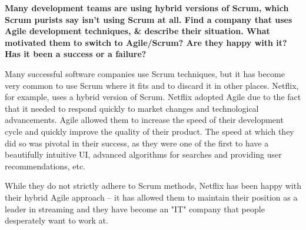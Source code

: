 \documentclass{article}
\begin{document}
\textbf{Many development teams are using hybrid versions of Scrum, which Scrum purists say isn't using Scrum at all. Find a company that uses Agile development techniques, \& describe their situation. What motivated them to switch to Agile/Scrum? Are they happy with it? Has it been a success or a failure?}

Many successful software companies use Scrum techniques, but it has become very common to use Scrum where it fits and to discard it in other places. Netflix, for example, uses a hybrid version of Scrum. Netflix adopted Agile due to the fact that it needed to respond quickly to market changes and technological advancements. Agile allowed them to increase the speed of their development cycle and quickly improve the quality of their product. The speed at which they did so was pivotal in their success, as they were one of the first to have a beautifully intuitive UI, advanced algorithms for searches and providing user recommendations, etc. 

While they do not strictly adhere to Scrum methods, Netflix has been happy with their hybrid Agile approach -- it has allowed them to maintain their position as a leader in streaming and they have become an "IT" company that people desperately want to work at.
\end{document}

